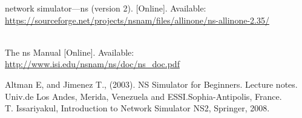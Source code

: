 \documentclass[conference,compsoc]{IEEEtran}
\begin{document}
\begin{thebibliography}{4}





network simulator—ns (version 2). [Online]. Available:\\
\url{
https://sourceforge.net/projects/nsnam/files/allinone/ns-allinone-2.35/
}

\\The ns Manual [Online]. Available:\\
\url{
http://www.isi.edu/nsnam/ns/doc/ns_doc.pdf
}

Altman E, and Jimenez T., (2003). NS Simulator for Beginners. Lecture notes. Univ.de Los Andes, Merida, Venezuela and ESSI.Sophia-Antipolis, France.\\

T. Issariyakul, Introduction to Network Simulator NS2, Springer, 2008.




\end{thebibliography}
     
\end{document}
